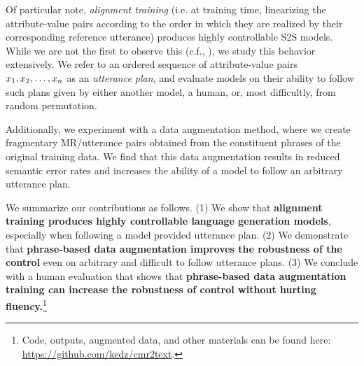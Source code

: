  Of particular note, \textit{alignment training} (i.e.  at training time, linearizing
the attribute-value pairs according to the order in which they are realized by
their corresponding reference utterance) produces highly controllable  S2S
models.  While we are not the first to observe this (c.f., \citet{nayak2017}),
we study this behavior extensively.  We refer to an ordered sequence of
attribute-value pairs $x_1, x_2, \ldots, x_n$ as an
\textit{utterance plan}, and evaluate models on their ability to follow such
plans given by either another model, a human, or, most difficultly, from
random permutation.

Additionally, we experiment with a data augmentation method, where we create
fragmentary MR/utterance pairs obtained from the constituent phrases of the
original training data.  We find that this data augmentation results in
reduced semantic error rates and increases the ability of a model to follow an
arbitrary utterance plan.

 We summarize our contributions as follows. (1) We show that \textbf{alignment training
produces highly controllable %
language generation models},
especially when following a model provided utterance plan. (2) We demonstrate that \textbf{phrase-based
data augmentation improves the robustness of the control} even on arbitrary
and difficult to follow utterance plans. (3) We conclude with a human
evaluation that shows that \textbf{phrase-based data augmentation training
can increase the robustness of control without hurting fluency.}\footnote{
    Code, outputs, augmented data, and other materials 
    can be found here: \url{https://github.com/kedz/cmr2text}.}


